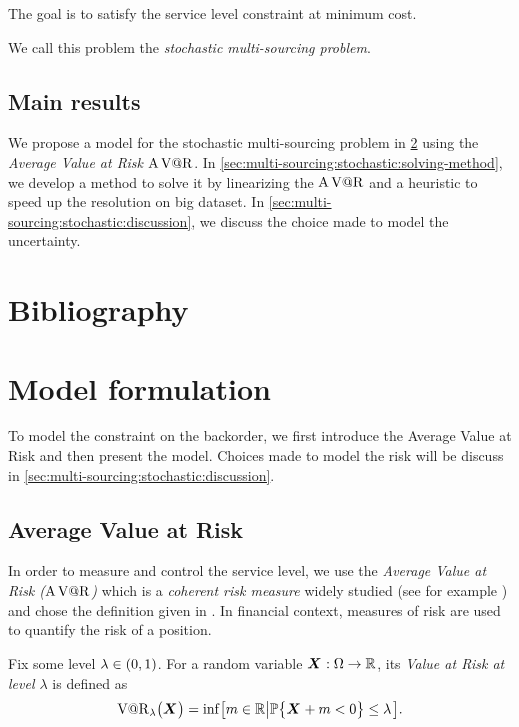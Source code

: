 The goal is to satisfy the service level constraint at minimum cost.


We call this problem the \emph{stochastic multi-sourcing problem}.


\subsection{Main results}
\label{sec:multi-sourcing:stochastic:introduction:main-results}


We propose a model for the stochastic multi-sourcing problem in \cref{sec:multi-sourcing:stochastic:model-formulation} using the \emph{Average Value at Risk $\operatorname{A\operatorname{V@R}}$}.
In \cref{sec:multi-sourcing:stochastic:solving-method}, we develop a method to solve it by linearizing the $\operatorname{A\operatorname{V@R}}$ and a heuristic to speed up the resolution on big dataset.
In \cref{sec:multi-sourcing:stochastic:discussion}, we discuss the choice made to model the uncertainty.



\section{Bibliography}
\label{sec:multi-sourcing:stochastic:bibliography}


\section{Model formulation}
\label{sec:multi-sourcing:stochastic:model-formulation}


To model the constraint on the backorder, we first introduce the Average Value at Risk and then present the model.
Choices made to model the risk will be discuss in \cref{sec:multi-sourcing:stochastic:discussion}.


\subsection{Average Value at Risk}


In order to measure and control the service level, we use the \emph{Average Value at Risk ($\operatorname{A\operatorname{V@R}}$)} which is a \emph{coherent risk measure} widely studied (see for example \cite{Artzner1999,Rockafellar2000,Rockafellar2002}) and chose the definition given in \cite{Follmer2004}.
In financial context, measures of risk are used to quantify the risk of a position.


Fix some level $\lambda\in\bracket{0,1}$. For a random variable $\va X:\scenarios\to\RR$, its \emph{Value at Risk at level $\lambda$} is defined as
\begin{equation}
\VaR_{\lambda}\bracket{\va X} = \inf\sqbracket{m\in\RR\left|\prob\crbracket{\va X+m<0}\le\lambda\right.}.
\end{equation}


